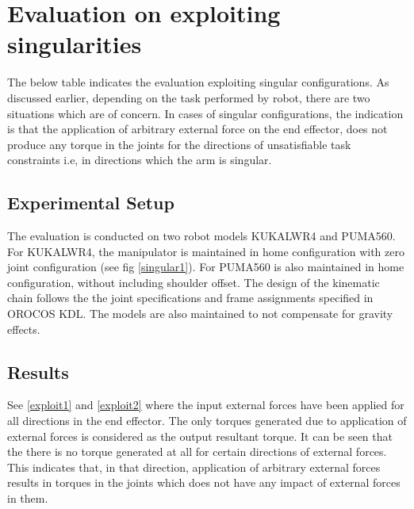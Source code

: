 \section{Evaluation on exploiting singularities}
The below table indicates the evaluation exploiting singular configurations. As discussed earlier, depending on the task performed by robot, there are two situations which are of concern. In cases of singular configurations, the indication is that the application of arbitrary external force on the end effector, does not produce any torque in the joints for the directions  of unsatisfiable task constraints i.e, in directions which the arm is singular.


\subsection{Experimental Setup}
The evaluation is conducted on two robot models KUKALWR4 and PUMA560. For KUKALWR4, the manipulator is maintained in home configuration with zero joint configuration (see fig \ref{singular1}). For PUMA560 is also maintained in home configuration, without including shoulder offset. The design of the kinematic chain follows the the joint specifications and frame assignments specified in OROCOS KDL. The models are also maintained to not compensate for gravity effects. 

\subsection{Results}
See \ref{exploit1} and \ref{exploit2} where the input external forces have been applied for all directions in the end effector. The only torques generated due to application of external forces is considered as the output resultant torque.
It can be seen that the there is no torque generated at all for certain directions of external forces. \color{blue}This indicates that, in that direction, application of arbitrary external forces results in torques in the joints which does not have any impact of external forces in them.\color{black}




